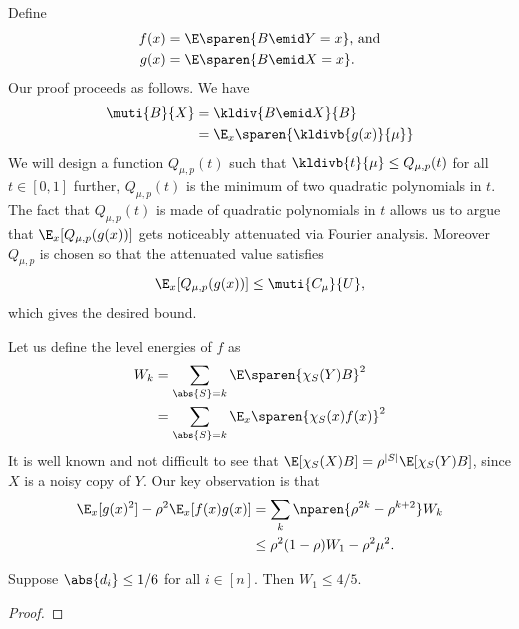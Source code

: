 Define
\begin{align*}
f(x) &= \E\sparen{B\emid Y=x}\text{, and}\\
g(x) &= \E\sparen{B\emid X=x}.
\end{align*}
Our proof proceeds as follows. We have 
\begin{align*}
\muti{B}{X} &= \kldiv{B\emid X}{B}\\
  &= \E_x\sparen{\kldivb{g(x)}{\mu}}
\end{align*}
We will design a function $Q_{\mu, p}(t)$ such that
$\kldivb{t}{\mu}\le Q_{\mu,p}(t)$ for all $t\in[0,1]$
further, $Q_{\mu,p}(t)$ is the minimum of two quadratic
polynomials in $t$.
The fact that $Q_{\mu,p}(t)$ is made of quadratic
polynomials in $t$ allows us to argue that
$\E_x[Q_{\mu,p}(g(x))]$ gets noticeably attenuated
via Fourier analysis. Moreover $Q_{\mu,p}$ is chosen
so that the attenuated value satisfies
\begin{equation*}
\E_x[Q_{\mu,p}(g(x))] \le \muti{C_\mu}{U},
\end{equation*}
which gives the desired bound.

Let us define the level energies
of $f$ as
\begin{align*}
W_k &= \sum_{\abs{S}=k}\E\sparen{\chi_S(Y)B}^2\\
    &= \sum_{\abs{S}=k}\E_x\sparen{\chi_S(x)f(x)}^2
\end{align*}
It is well known and not difficult to see that
$\E[\chi_S(X)B] = \rho^{|S|}\E[\chi_S(Y)B]$, since
$X$ is a noisy copy of $Y$. Our key observation is that
\begin{align*}
\E_x[g(x)^2] - \rho^2\E_x[f(x)g(x)]
  &=   \sum_{k}\nparen{\rho^{2k} - \rho^{k+2}} W_k\\
  &\le \rho^2(1-\rho) W_1 - \rho^2\mu^2.
\end{align*}

\begin{lemma}
Suppose $\abs{d_i}\le 1/6$ for all $i\in[n]$. Then $W_1\le 4/5$.
\end{lemma}
\begin{proof}
\end{proof}
